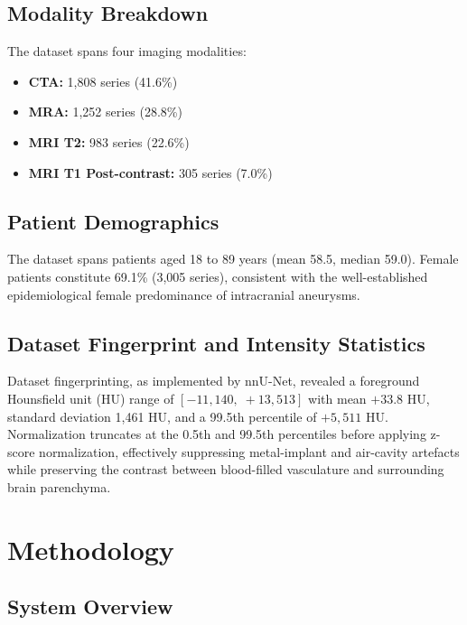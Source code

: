 \documentclass[journal]{IEEEtran}
\begin{document}
\subsection{Modality Breakdown}

The dataset spans four imaging modalities:
\begin{itemize}
  \item \textbf{CTA:} 1,808 series (41.6\%)
  \item \textbf{MRA:} 1,252 series (28.8\%)
  \item \textbf{MRI T2:}  983 series (22.6\%)
  \item \textbf{MRI T1 Post-contrast:} 305 series (7.0\%)
\end{itemize}

\subsection{Patient Demographics}

The dataset spans patients aged 18 to 89 years (mean 58.5, median 59.0).
Female patients constitute 69.1\% (3,005 series), consistent with the
well-established epidemiological female predominance of intracranial aneurysms.

\subsection{Dataset Fingerprint and Intensity Statistics}

Dataset fingerprinting, as implemented by nnU-Net, revealed a foreground
Hounsfield unit (HU) range of $[-11{,}140,\;+13{,}513]$ with mean $+33.8$ HU,
standard deviation 1,461 HU, and a 99.5th percentile of $+5,511$ HU.
Normalization truncates at the 0.5th and 99.5th percentiles before applying
z-score normalization, effectively suppressing metal-implant and air-cavity
artefacts while preserving the contrast between blood-filled vasculature
and surrounding brain parenchyma.

\section{Methodology}
\label{sec:method}

\subsection{System Overview}
\end{document}
